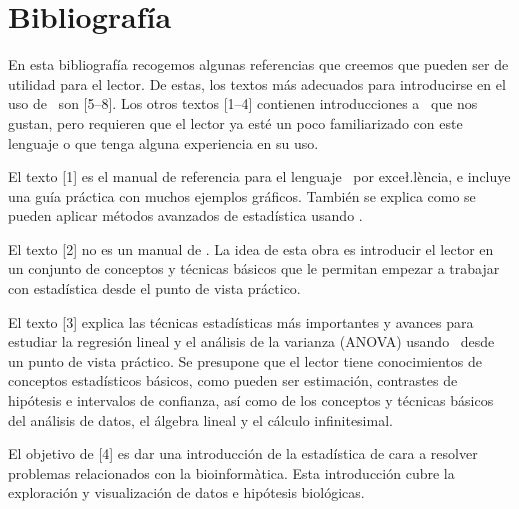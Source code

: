 
























\chapter*{Bibliografía}

En esta bibliografía recogemos algunas referencias que creemos que pueden 
ser de utilidad para el lector. De estas, los textos más adecuados para introducirse en el uso de \Rt\ son \mbox{[5--8]}. Los otros textos [1--4] contienen introducciones a \Rt\ que nos gustan, pero requieren que el lector ya esté un poco familiarizado con este lenguaje o que tenga alguna experiencia en su uso.


El texto [1] es el manual de referencia para el lenguaje \Rt\ por exce\l.lència, e incluye una guía práctica con muchos ejemplos gráficos. También se explica como se pueden aplicar métodos avanzados de estadística usando \Rt.

El texto [2] no es un manual de \Rt. La idea de esta obra es introducir el lector en un conjunto de conceptos y técnicas básicos que le permitan empezar a trabajar con estadística desde el punto de vista práctico. 

El texto [3] explica las técnicas estadísticas más importantes y avances para estudiar la regresión lineal y el análisis de la varianza (ANOVA) usando \Rt\ desde un punto de vista práctico. Se presupone que el lector tiene conocimientos de conceptos estadísticos básicos, como pueden ser estimación, contrastes de hipótesis e intervalos de confianza, así como de los conceptos y técnicas básicos del análisis de datos, el álgebra lineal y el cálculo infinitesimal. 

El objetivo de [4] es dar una introducción de la estadística de cara a resolver problemas relacionados con la bioinformàtica. Esta introducción cubre la exploración y visualización de datos e hipótesis biológicas. 

